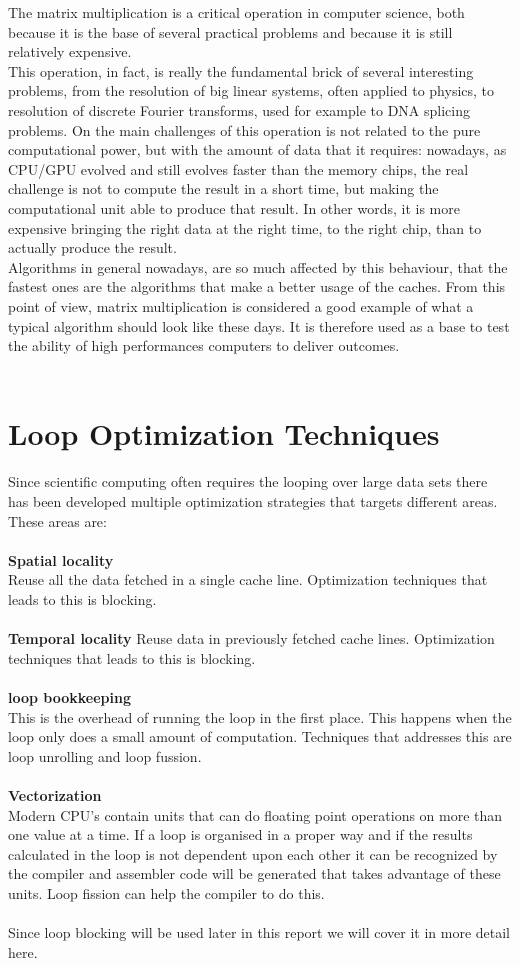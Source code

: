 The matrix multiplication is a critical operation in computer science, both because it is the base of several practical problems and because it is still relatively expensive. \\
This operation, in fact, is really the fundamental brick of several interesting problems, from the resolution of big linear systems, often applied to physics, to resolution of discrete Fourier transforms, used for example to DNA splicing problems.
On the main challenges of this operation is not related to the pure computational power, but with the amount of data that it requires: nowadays, as CPU/GPU evolved and still evolves faster than the memory chips, the real challenge is not to compute the result in a short time, but making the computational unit able to produce that result. In other words, it is more expensive bringing the right data at the right time, to the right chip, than to actually produce the result. \\
Algorithms in general nowadays, are so much affected by this behaviour, that the fastest ones are the algorithms that make a better usage of the caches.
From this point of view, matrix multiplication is considered a good example of what a typical algorithm should look like these days. It is therefore used as a base to test the ability of high performances computers to deliver outcomes. 
\\\\
\section{Loop Optimization Techniques}
Since scientific computing often requires the looping over large data sets there has been developed multiple optimization strategies that targets different areas. These areas are:
\\\\
\textbf{Spatial locality}\\
Reuse all the data fetched in a single cache line. Optimization techniques that leads to this is blocking.
\\\\
\textbf{Temporal locality}
Reuse data in previously fetched cache lines. Optimization techniques that leads to this is blocking.
\\\\
\textbf{loop bookkeeping}\\ 
This is the overhead of running the loop in the first place. This happens when the loop only does a small amount of computation. Techniques that addresses this are loop unrolling and loop fussion. 
\\\\
\textbf{Vectorization}\\
Modern CPU's contain units that can do floating point operations on more than one value at a time. If a loop is organised in a proper way and if the results calculated in the loop is not dependent upon each other it can be recognized by the compiler and assembler code will be generated that takes advantage of these units. Loop fission can help the compiler to do this. 
\\\\
Since loop blocking will be used later in this report we will cover it in more detail here.
